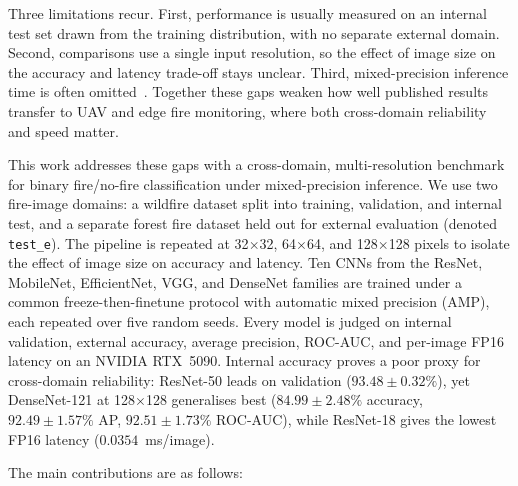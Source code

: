\documentclass[conference]{IEEEtran}
\begin{document}
Three limitations recur. First, performance is usually measured on an internal test set drawn from the training distribution, with no separate external domain. Second, comparisons use a single input resolution, so the effect of image size on the accuracy and latency trade-off stays unclear. Third, mixed-precision inference time is often omitted~\cite{bukhari2025irtq, mamadmurodov2025hybrid, mambile2025cnn}. Together these gaps weaken how well published results transfer to UAV and edge fire monitoring, where both cross-domain reliability and speed matter.

This work addresses these gaps with a cross-domain, multi-resolution benchmark for binary fire/no-fire classification under mixed-precision inference. We use two fire-image domains: a wildfire dataset split into training, validation, and internal test, and a separate forest fire dataset held out for external evaluation (denoted \texttt{test\_e}). The pipeline is repeated at 32$\times$32, 64$\times$64, and 128$\times$128 pixels to isolate the effect of image size on accuracy and latency. Ten CNNs from the ResNet, MobileNet, EfficientNet, VGG, and DenseNet families are trained under a common freeze-then-finetune protocol with automatic mixed precision (AMP), each repeated over five random seeds. Every model is judged on internal validation, external accuracy, average precision, ROC-AUC, and per-image FP16 latency on an NVIDIA RTX~5090. Internal accuracy proves a poor proxy for cross-domain reliability: ResNet-50 leads on validation ($93.48\pm0.32\%$), yet DenseNet-121 at 128$\times$128 generalises best ($84.99\pm2.48\%$ accuracy, $92.49\pm1.57\%$ AP, $92.51\pm1.73\%$ ROC-AUC), while ResNet-18 gives the lowest FP16 latency ($0.0354$~ms/image).

The main contributions are as follows:
\end{document}
